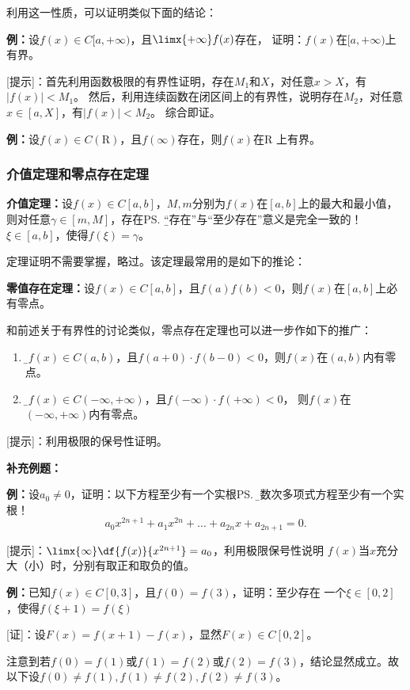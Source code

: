 利用这一性质，可以证明类似下面的结论：

{\bf 例：}设$f(x)\in C[a,+\infty)$，且$\limx{+\infty}f(x)$存在，
证明：$f(x)$在$[a,+\infty)$上有界。

[提示]：首先利用函数极限的有界性证明，存在$M_1$和$X$，对任意$x>X$，有$|f(x)|<M_1$。
然后，利用连续函数在闭区间上的有界性，说明存在$M_2$，对任意$x\in[a,X]$，有$|f(x)|<M_2$。
综合即证。

{\bf 例：}设$f(x)\in C(\mathrm{R})$，且$f(\infty)$存在，则$f(x)$在$\mathrm{R}$
上有界。

\subsubsection{介值定理和零点存在定理}

{\bf 介值定理：}设$f(x)\in C[a,b]$，$M,m$分别为$f(x)$在$[a,b]$上的最大和最小值，
则对任意$\gamma\in[m,M]$，存在\ps{\b “存在”与“至少存在”意义是完全一致的！}
$\xi\in[a,b]$，使得$f(\xi)=\gamma$。

定理证明不需要掌握，略过。该定理最常用的是如下的推论：

{\bf 零值存在定理：}设$f(x)\in C[a,b]$，且$f(a)f(b)<0$，则$f(x)$在$[a,b]$上必有零点。

和前述关于有界性的讨论类似，零点存在定理也可以进一步作如下的推广：
\begin{enumerate}[(1)]
  \setlength{\itemindent}{1cm}
  \item {\b 设$f(x)\in C(a,b)$，且$f(a+0)\cdot f(b-0)<0$，则$f(x)$在$(a,b)$内有零点。} 
  \item {\b 设$f(x)\in C(-\infty,+\infty)$，且$f(-\infty)\cdot f(+\infty)<0$，
  则$f(x)$在$(-\infty,+\infty)$内有零点。}
\end{enumerate}

[提示]：利用极限的保号性证明。

{\bf 补充例题：}

{\bf 例：}设$a_0\ne 0$，证明：以下方程至少有一个实根\ps{\b 奇数次多项式方程至少有一个实根！}
$$a_0x^{2n+1}+a_1x^{2n}+\ldots+a_{2n}x+a_{2n+1}=0.$$

[提示]：$\limx{\infty}\df{f(x)}{x^{2n+1}}=a_0$，利用极限保号性说明
$f(x)$当$x$充分大（小）时，分别有取正和取负的值。

{\bf 例：}已知$f(x)\in C[0,3]$，且$f(0)=f(3)$，证明：至少存在
一个$\xi\in[0,2]$，使得$f(\xi+1)=f(\xi)$

[证]：设$F(x)=f(x+1)-f(x)$，显然$F(x)\in C[0,2]$。

注意到若$f(0)=f(1)$或$f(1)=f(2)$或$f(2)=f(3)$，结论显然成立。故以下设$f(0)\ne f(1),
f(1)\ne f(2),f(2)\ne f(3)$。

